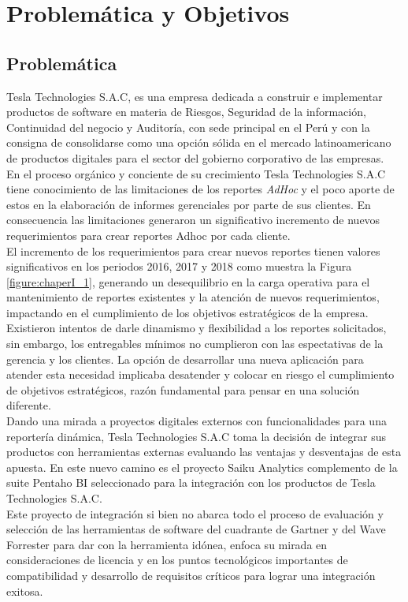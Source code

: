\chapter{Problemática y Objetivos} \label{chapter:I}
\section{Problem\'{a}tica}
\begin{spacing}{1.5}	
	Tesla Technologies S.A.C, es una empresa dedicada a construir e implementar productos de software en materia de Riesgos, Seguridad de la información, Continuidad del negocio y Auditoría, con sede principal en el Perú y con la consigna de consolidarse como una opci\'{o}n s\'{o}lida en el mercado latinoamericano de productos digitales para el sector del gobierno corporativo de las empresas.\\	                         
	En el proceso org\'{a}nico y conciente de su crecimiento Tesla Technologies S.A.C tiene conocimiento de las limitaciones de los reportes \textit{AdHoc} y el poco aporte de estos en la elaboraci\'{o}n de informes gerenciales por parte de sus clientes. En consecuencia las limitaciones generaron un significativo incremento de nuevos requerimientos para crear reportes Adhoc por cada cliente.\\
	El incremento de los requerimientos para crear nuevos reportes tienen valores significativos en los periodos 2016, 2017 y 2018 como muestra la Figura \ref{figure:chaperI_1}, generando un desequilibrio en la carga operativa para el mantenimiento de reportes existentes y la atenci\'{o}n de nuevos requerimientos, impactando en el cumplimiento de los objetivos estrat\'{e}gicos de la empresa.\\
	Existieron intentos de darle dinamismo y flexibilidad a los reportes solicitados, sin embargo,  los entregables m\'{i}nimos no cumplieron con las espectativas de la gerencia y los clientes. La opci\'{o}n de desarrollar una nueva aplicaci\'{o}n para atender esta necesidad implicaba desatender y colocar en riesgo el cumplimiento de objetivos estrat\'{e}gicos, raz\'{o}n fundamental para pensar en una soluci\'{o}n diferente.\\
	Dando una mirada a proyectos digitales externos con funcionalidades para una reporter\'{i}a din\'{a}mica, Tesla Technologies S.A.C toma la decisi\'{o}n de integrar sus productos con herramientas externas evaluando las ventajas y desventajas de esta apuesta. En este nuevo camino es el proyecto Saiku Analytics complemento de la suite Pentaho BI seleccionado para la integración con los productos de Tesla Technologies S.A.C.\\	
	Este proyecto de integraci\'{o}n si bien no abarca todo el proceso de evaluaci\'{o}n y selecci\'{o}n de  las herramientas de software del cuadrante de Gartner y del Wave Forrester para dar con la herramienta id\'{o}nea, enfoca su mirada en consideraciones de licencia y en los puntos tecnol\'{o}gicos importantes de compatibilidad y desarrollo de requisitos cr\'{i}ticos para lograr una integraci\'{o}n exitosa.\\
	

\end{spacing}
